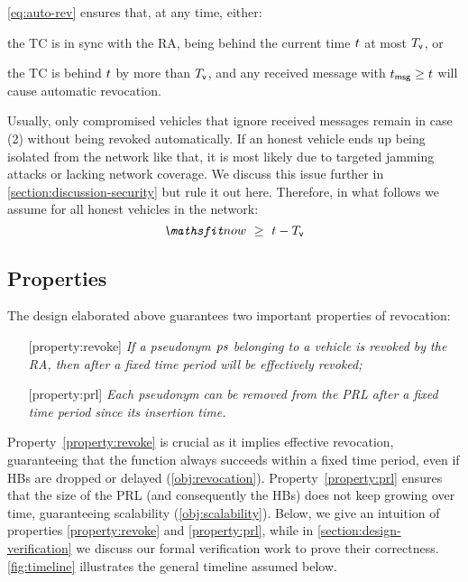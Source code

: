 \cref{eq:auto-rev} ensures that, at any time, either:
%
\begin{inparaenum}
    \item the \ac{TC} is in sync with the \ac{RA}, being behind the current
    time $\emph{$t$}$ at most $\emph{$T_{\mathsf{v}}$}{}$, or
    \item the \ac{TC} is behind $\emph{$t$}$ by more than $\emph{$T_{\mathsf{v}}$}{}$, and any
      received message with $\emph{$t_{\mathsf{msg}}$}{} \geq t$ will cause automatic
      revocation.
\end{inparaenum}
%
Usually, only compromised vehicles that ignore received messages remain in case
(2) without being revoked automatically. If an honest vehicle ends up being
isolated from the network like that, it is most likely due to targeted jamming
attacks or lacking network coverage. We discuss this issue further in
\cref{section:discussion-security} but rule it out here. Therefore, in what
follows we assume for all honest vehicles in the network:
%
\begin{equation}
    \label{eq:honest}
    \funcnow \ \geq\ \paramtra{} - \paramtt{}
\end{equation}

\subsection{Properties}
\label{section:design-properties}



The design elaborated above guarantees two important properties of revocation:
\begin{enumerate}
    \item[{\crtcrossreflabel{(i)}[property:revoke]}] \emph{If a pseudonym $\emph{$\mathit{ps}$}$
    belonging to a vehicle  is revoked by the \ac{RA}, then after a
    fixed time period \paramteff{}  will be effectively
    revoked;}
    \item[{\crtcrossreflabel{(ii)}[property:prl]}] \emph{Each pseudonym can be
    removed from the \ac{PRL} after a fixed time period \paramtprl{} since its
    insertion time.}
\end{enumerate}

Property~\ref{property:revoke} is crucial as it implies effective revocation,
guaranteeing that the \funcrevokedaa{} function always succeeds within a fixed
time period, even if \acp{HB} are dropped or delayed (\ref{obj:revocation}).
Property~\ref{property:prl} ensures that the size of the \ac{PRL} (and
consequently the \acp{HB}) does not keep growing over time, guaranteeing
scalability (\ref{obj:scalability}). Below, we give an intuition of properties
\ref{property:revoke} and \ref{property:prl}, while in
\cref{section:design-verification} we discuss our formal verification work to
prove their correctness. \cref{fig:timeline} illustrates the general timeline
assumed below.

